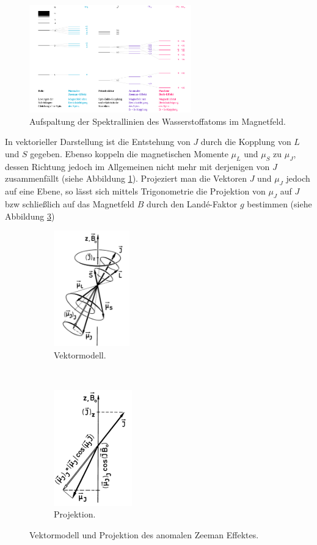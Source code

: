 \documentclass{subfiles}
\begin{document}
        \begin{figure}
            \centering
            \includegraphics[width=7cm]{Bilddateien/Wasserstoff_Zeeman.svg.png}
            \caption{Aufspaltung der Spektrallinien des Wasserstoffatoms im Magnetfeld.}
        \end{figure}
        In vektorieller Darstellung ist die Entstehung von $J$ durch die Kopplung von $L$ und $S$ gegeben. Ebenso koppeln die magnetischen Momente $\mu_L$ und $\mu_S$ zu $\mu_J$, dessen Richtung jedoch im Allgemeinen nicht mehr mit derjenigen von $J$ zusammenfällt (siehe Abbildung \ref{fig:VektormodellAnomalZeeman}). Projeziert man die Vektoren $J$ und $\mu_J$ jedoch auf eine Ebene, so lässt sich mittels Trigonometrie die Projektion von $\mu_J$ auf $J$ bzw schließlich auf das Magnetfeld $B$ durch den Landé-Faktor $g$ bestimmen (siehe Abbildung \ref{fig:ProjektionVektormodellAnomalerZeeman})
        \begin{figure}[H]
            \centering
            \begin{subfigure}[b]{0.4\textwidth}
                \centering
                \includegraphics[height=5cm]{Bilddateien/VektormodellAnomalZeeman.png}
                \caption{Vektormodell.}
                \label{fig:VektormodellAnomalZeeman}
            \end{subfigure}
            \
            \begin{subfigure}[b]{0.4\textwidth}
                \centering
                \includegraphics[height=5cm]{Bilddateien/ProjektionVektormodellAnomalerZeeman.png}
                \caption{Projektion.}
                \label{fig:ProjektionVektormodellAnomalerZeeman}
            \end{subfigure}
            \caption{Vektormodell und Projektion des anomalen Zeeman Effektes.}
        \end{figure}
\end{document}
